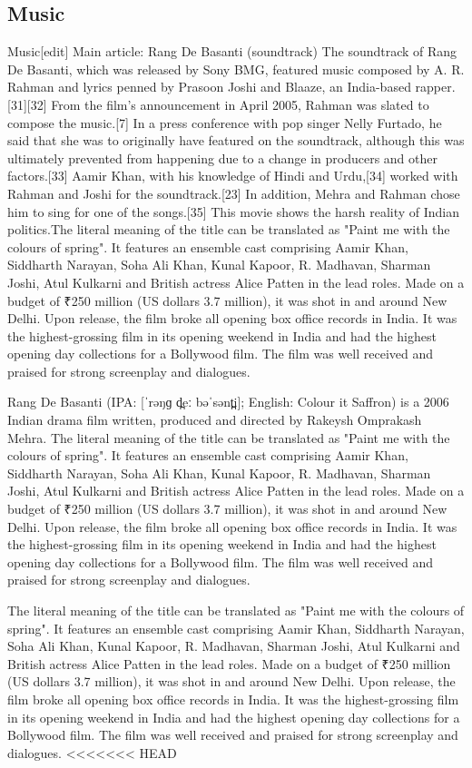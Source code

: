 \documentclass{article}
\begin{document}
\subsection{Music}
Music[edit]
Main article: Rang De Basanti (soundtrack)
The soundtrack of Rang De Basanti, which was released by Sony BMG, featured music composed by A. R. Rahman and lyrics penned by Prasoon Joshi and Blaaze, an India-based rapper.[31][32] From the film's announcement in April 2005, Rahman was slated to compose the music.[7] In a press conference with pop singer Nelly Furtado, he said that she was to originally have featured on the soundtrack, although this was ultimately prevented from happening due to a change in producers and other factors.[33] Aamir Khan, with his knowledge of Hindi and Urdu,[34] worked with Rahman and Joshi for the soundtrack.[23] In addition, Mehra and Rahman chose him to sing for one of the songs.[35]
This movie shows the harsh reality of Indian politics.The literal meaning of the title can be translated as "Paint me with the colours of spring". It features an ensemble cast comprising Aamir Khan, Siddharth Narayan, Soha Ali Khan, Kunal Kapoor, R. Madhavan, Sharman Joshi, Atul Kulkarni and British actress Alice Patten in the lead roles. Made on a budget of ₹250 million (US dollars 3.7 million), it was shot in and around New Delhi. Upon release, the film broke all opening box office records in India. It was the highest-grossing film in its opening weekend in India and had the highest opening day collections for a Bollywood film. The film was well received and praised for strong screenplay and dialogues.

Rang De Basanti (IPA: [ˈrəŋɡ d̪eː bəˈsənt̪i]; English: Colour it Saffron) is a 2006 Indian drama film written, produced and directed by Rakeysh Omprakash Mehra. The literal meaning of the title can be translated as "Paint me with the colours of spring". It features an ensemble cast comprising Aamir Khan, Siddharth Narayan, Soha Ali Khan, Kunal Kapoor, R. Madhavan, Sharman Joshi, Atul Kulkarni and British actress Alice Patten in the lead roles. Made on a budget of ₹250 million (US dollars 3.7 million), it was shot in and around New Delhi. Upon release, the film broke all opening box office records in India. It was the highest-grossing film in its opening weekend in India and had the highest opening day collections for a Bollywood film. The film was well received and praised for strong screenplay and dialogues.

The literal meaning of the title can be translated as "Paint me with the colours of spring". It features an ensemble cast comprising Aamir Khan, Siddharth Narayan, Soha Ali Khan, Kunal Kapoor, R. Madhavan, Sharman Joshi, Atul Kulkarni and British actress Alice Patten in the lead roles. Made on a budget of ₹250 million (US dollars 3.7 million), it was shot in and around New Delhi. Upon release, the film broke all opening box office records in India. It was the highest-grossing film in its opening weekend in India and had the highest opening day collections for a Bollywood film. The film was well received and praised for strong screenplay and dialogues.
<<<<<<< HEAD
\end{document}
